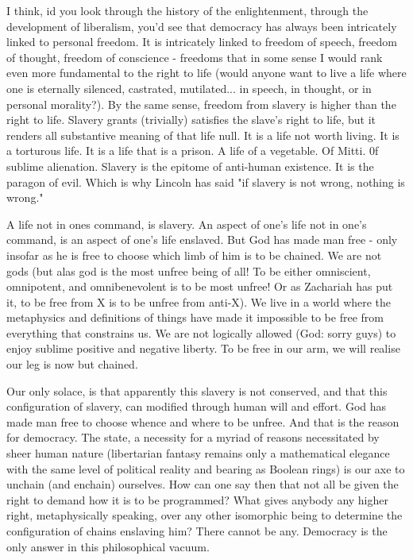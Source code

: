 I think, id you look through the history of the enlightenment, through the development of liberalism, you'd see that democracy has always been intricately linked to personal freedom. It is intricately linked to freedom of speech, freedom of thought, freedom of conscience - freedoms that in some sense I would rank even more fundamental to the right to life (would anyone want to live a life where one is eternally silenced, castrated, mutilated... in speech, in thought, or in personal morality?). By the same sense, freedom from slavery is higher than the right to life. Slavery grants (trivially) satisfies the slave's right to life, but it renders all substantive meaning of that life null. It is a life not worth living. It is a torturous life. It is a life that is a prison. A life of a vegetable. Of Mitti. 0f sublime alienation. Slavery is the epitome of anti-human existence. It is the paragon of evil.
Which is why Lincoln has said "if slavery is not wrong, nothing is wrong."

A life not in ones command, is slavery. An aspect of one's life not in one's command, is an aspect of one's life enslaved. But God has made man free - only insofar as he is free to choose which limb of him is to be chained. We are not gods (but alas god is the most unfree being of all! To be either omniscient, omnipotent, and omnibenevolent is to be most unfree! Or as Zachariah has put it, to be free from X is to be unfree from anti-X). We live in a world where the metaphysics and definitions of things have made it impossible to be free from everything  that constrains us. We are not logically allowed (God: sorry guys) to enjoy sublime positive and negative liberty. To be free in our arm, we will realise our leg is now but chained. 

Our only solace, is that apparently this slavery is not conserved, and that this configuration of slavery, can modified through human will and effort. God has made man free to choose whence and where to be unfree. And that is the reason for democracy. The state, a necessity for a myriad of reasons necessitated by sheer human nature (libertarian fantasy remains only a mathematical elegance with the same level of political reality and bearing as Boolean rings) is our axe to unchain (and enchain) ourselves. How can one say then that not all be given the right to demand how it is to be programmed? What gives anybody any higher right, metaphysically speaking, over any other isomorphic being to determine the configuration of chains enslaving him? There cannot be any. Democracy is the only answer in this philosophical vacuum. 

